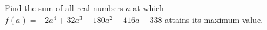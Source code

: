 Find the sum of all real numbers $a$ at which $f(a)=-2a^4+32a^3-180a^2+416a-338$ attains its maximum value.

